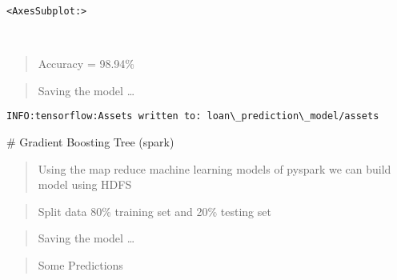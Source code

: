 \documentclass[11pt]{article}
\makeatletter
\newcommand{\boxspacing}{\kern\kvtcb@left@rule\kern\kvtcb@boxsep}
\newcommand{\prompt}[4]{
        {\ttfamily\llap{{\color{#2}[#3]:\hspace{3pt}#4}}\vspace{-\baselineskip}}
    }
\makeatother
\begin{document}
            \begin{tcolorbox}[breakable, size=fbox, boxrule=.5pt, pad at break*=1mm, opacityfill=0]
\prompt{Out}{outcolor}{72}{\boxspacing}
\begin{Verbatim}[commandchars=\\\{\}]
<AxesSubplot:>
\end{Verbatim}
\end{tcolorbox}
        
    \begin{center}
    \end{center}
    { \hspace*{\fill} \\}
    
    \begin{quote}
Accuracy = 98.94\%
\end{quote}

    \begin{quote}
Saving the model \ldots{}
\end{quote}

    \begin{Verbatim}[commandchars=\\\{\}]
INFO:tensorflow:Assets written to: loan\_prediction\_model/assets
    \end{Verbatim}

    \# Gradient Boosting Tree (spark)

    \begin{quote}
Using the map reduce machine learning models of pyspark we can build
model using HDFS
\end{quote}

    \begin{quote}
Split data 80\% training set and 20\% testing set
\end{quote}

    \begin{quote}
Saving the model \ldots{}
\end{quote}

    \begin{quote}
Some Predictions
\end{quote}
\end{document}
